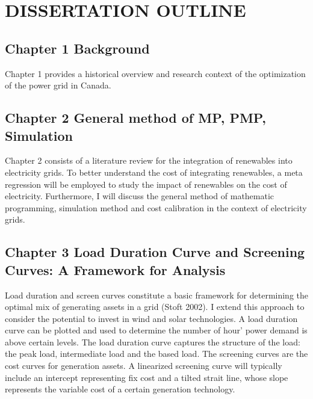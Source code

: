 \section{DISSERTATION OUTLINE}\label{dissertation-outline}

\subsection{Chapter 1 Background }\label{chapter-1-background}

Chapter 1 provides a historical overview and research context of the
optimization of the power grid in Canada.

\subsection{Chapter 2 General method of MP, PMP,
Simulation}\label{chapter-2-general-method-of-mp-pmp-simulation}

Chapter 2 consists of a literature review for the integration of
renewables into electricity grids. To better understand the cost of
integrating renewables, a meta regression will be employed to study the
impact of renewables on the cost of electricity. Furthermore, I will
discuss the general method of mathematic programming, simulation method
and cost calibration in the context of electricity grids.

\subsection{Chapter 3 Load Duration Curve and Screening Curves: A
Framework for
Analysis}\label{chapter-3-load-duration-curve-and-screening-curves-a-framework-for-analysis}

Load duration and screen curves constitute a basic framework for
determining the optimal mix of generating assets in a grid (Stoft 2002).
I extend this approach to consider the potential to invest in wind and
solar technologies. A load duration curve can be plotted and used to
determine the number of hour' power demand is above certain levels. The
load duration curve captures the structure of the load: the peak load,
intermediate load and the based load. The screening curves are the cost
curves for generation assets. A linearized screening curve will
typically include an intercept representing fix cost and a tilted strait
line, whose slope represents the variable cost of a certain generation
technology.

